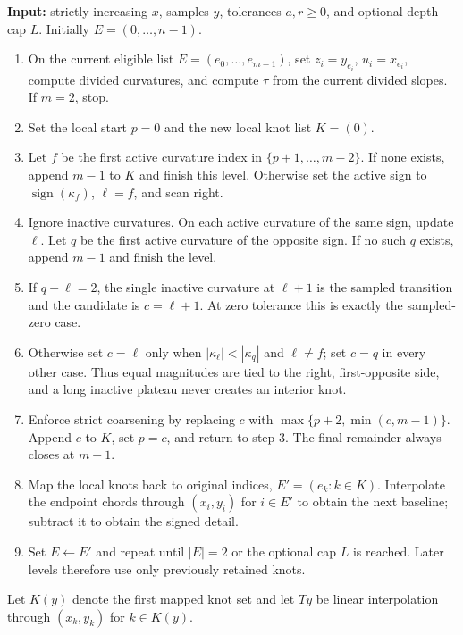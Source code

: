 \documentclass[review,onefignum,onetabnum]{siamonline250211}
\begin{document}
\begin{algorithm}[H]
\caption{One centred HCRD hierarchy on an irregular grid}
\label{alg:hcrd}
\small
\textbf{Input:} strictly increasing $x$, samples $y$, tolerances $a,r\ge0$,
and optional depth cap $L$.  Initially $E=(0,\ldots,n-1)$.
\begin{enumerate}
\setlength{\itemsep}{1pt}
\item On the current eligible list $E=(e_0,\ldots,e_{m-1})$, set
$z_i=y_{e_i}$, $u_i=x_{e_i}$, compute divided curvatures, and compute $\tau$
from the current divided slopes.  If $m=2$, stop.
\item Set the local start $p=0$ and the new local knot list $K=(0)$.
\item Let $f$ be the first active curvature index in
$\{p+1,\ldots,m-2\}$.  If none exists, append $m-1$ to $K$ and finish this
level.  Otherwise set the active sign to $\operatorname{sign}(\kappa_f)$,
$\ell=f$, and scan right.
\item Ignore inactive curvatures.  On each active curvature of the same sign,
update $\ell$.  Let $q$ be the first active curvature of the opposite sign.  If
no such $q$ exists, append $m-1$ and finish the level.
\item If $q-\ell=2$, the single inactive curvature at $\ell+1$ is the sampled
transition and the candidate is $c=\ell+1$.  At zero tolerance this is exactly
the sampled-zero case.
\item Otherwise set $c=\ell$ only when
$|\kappa_\ell|<|\kappa_q|$ and $\ell\ne f$; set $c=q$ in every other case.
Thus equal magnitudes are tied to the right, first-opposite side, and a long
inactive plateau never creates an interior knot.
\item Enforce strict coarsening by replacing
$c$ with $\max\{p+2,\min(c,m-1)\}$.  Append $c$ to $K$, set $p=c$, and return
to step 3.  The final remainder always closes at $m-1$.
\item Map the local knots back to original indices, $E'=(e_k:k\in K)$.
Interpolate the endpoint chords through $(x_i,y_i)$ for $i\in E'$ to obtain the
next baseline; subtract it to obtain the signed detail.
\item Set $E\leftarrow E'$ and repeat until $|E|=2$ or the optional cap $L$ is
reached.  Later levels therefore use only previously retained knots.
\end{enumerate}
\end{algorithm}

Let $K(y)$ denote the first mapped knot set and let $Ty$ be linear
interpolation through $(x_k,y_k)$ for $k\in K(y)$.
\end{document}

